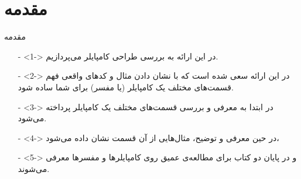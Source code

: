 \section{مقدمه}
\begin{frame}{مقدمه}
\begin{itemize}\itemr
\item[-]<1->
در این ارائه به بررسی طراحی کامپایلر می‌پردازیم.

\item[-]<2->
در این ارائه سعی شده است که با نشان دادن مثال و کد‌های واقعی فهم قسمت‌های مختلف یک کامپایلر (یا مفسر) برای شما ساده شود.

\item[-]<3->
در ابتدا به معرفی و بررسی قسمت‌های مختلف یک کامپایلر پرداخته می‌شود.

\item[-]<4->
در حین معرفی و توضیح، مثال‌هایی از آن قسمت نشان داده می‌شود،

\item[-]<5->
و در پایان دو کتاب برای مطالعه‌ی عمیق روی کامپایلر‌ها و مفسرها معرفی می‌شوند.

\end{itemize}
\end{frame}